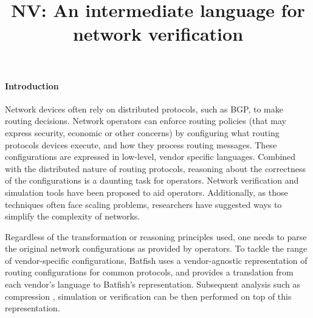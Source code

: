 \documentclass[sigconf,10pt]{acmart}
\begin{document}
\title{NV: An intermediate language for network verification}


\maketitle

%
%
%
%

\paragraph{Introduction} 

Network devices often rely on distributed protocols, such as BGP, to
make routing decisions. Network operators can enforce routing policies
(that may express security, economic or other concerns) by configuring
what routing protocols devices execute, and how they process routing
messages.  These configurations are expressed in low-level, vendor
specific languages. Combined with the distributed nature of routing
protocols, reasoning about the correctness of the configurations is a
daunting task for operators.  Network verification
\cite{minesweeper,arc} and simulation tools \cite{batfish} have been
proposed to aid operators. Additionally, as those techniques often
face scaling problems, researchers have suggested ways \cite{bonsai} to simplify the complexity of networks.

Regardless of the transformation or reasoning principles used, one
needs to parse the original network configurations as provided by
operators. To tackle the range of vendor-specific configurations,
Batfish \cite{batfish} uses a vendor-agnostic representation of
routing configurations for common protocols, and provides a translation from each vendor's
language to Batfish's representation. Subsequent analysis such as
compression \cite{bonsai}, simulation \cite{batfish} or verification
\cite{minesweeper,arc} can be then performed on top of this
representation.
\end{document}
